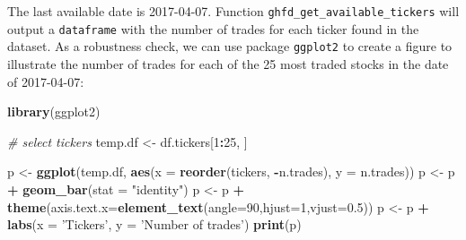 \documentclass[11pt,]{book}
\newenvironment{Shaded}{\begin{snugshade}}{\end{snugshade}}
\newcommand{\KeywordTok}[1]{\textcolor[rgb]{0.27,0.27,0.27}{\textbf{#1}}}
\newcommand{\DataTypeTok}[1]{\textcolor[rgb]{0.27,0.27,0.27}{#1}}
\newcommand{\DecValTok}[1]{\textcolor[rgb]{0.06,0.06,0.06}{#1}}
\newcommand{\FloatTok}[1]{\textcolor[rgb]{0.06,0.06,0.06}{#1}}
\newcommand{\StringTok}[1]{\textcolor[rgb]{0.5,0.5,0.5}{#1}}
\newcommand{\CommentTok}[1]{\textcolor[rgb]{0.56,0.35,0.01}{\textit{#1}}}
\newcommand{\OperatorTok}[1]{\textcolor[rgb]{0.81,0.36,0.00}{\textbf{#1}}}
\newcommand{\NormalTok}[1]{#1}
\begin{document}
\begin{Shaded}
\end{Shaded}

The last available date is 2017-04-07. Function
\texttt{ghfd\_get\_available\_tickers} will output a \texttt{dataframe}
with the number of trades for each ticker found in the dataset. As a
robustness check, we can use package \texttt{ggplot2} to create a figure
to illustrate the number of trades for each of the 25 most traded stocks
in the date of 2017-04-07:

\begin{Shaded}
\begin{Highlighting}[]
\KeywordTok{library}\NormalTok{(ggplot2)}

\CommentTok{# select tickers}
\NormalTok{temp.df <-}\StringTok{ }\NormalTok{df.tickers[}\DecValTok{1}\OperatorTok{:}\DecValTok{25}\NormalTok{, ]}

\NormalTok{p <-}\StringTok{ }\KeywordTok{ggplot}\NormalTok{(temp.df, }\KeywordTok{aes}\NormalTok{(}\DataTypeTok{x =} \KeywordTok{reorder}\NormalTok{(tickers, }\OperatorTok{-}\NormalTok{n.trades), }\DataTypeTok{y =}\NormalTok{ n.trades))}
\NormalTok{p <-}\StringTok{ }\NormalTok{p }\OperatorTok{+}\StringTok{ }\KeywordTok{geom_bar}\NormalTok{(}\DataTypeTok{stat =} \StringTok{"identity"}\NormalTok{)}
\NormalTok{p <-}\StringTok{ }\NormalTok{p }\OperatorTok{+}\StringTok{ }\KeywordTok{theme}\NormalTok{(}\DataTypeTok{axis.text.x=}\KeywordTok{element_text}\NormalTok{(}\DataTypeTok{angle=}\DecValTok{90}\NormalTok{,}\DataTypeTok{hjust=}\DecValTok{1}\NormalTok{,}\DataTypeTok{vjust=}\FloatTok{0.5}\NormalTok{))}
\NormalTok{p <-}\StringTok{ }\NormalTok{p }\OperatorTok{+}\StringTok{ }\KeywordTok{labs}\NormalTok{(}\DataTypeTok{x =} \StringTok{'Tickers'}\NormalTok{, }\DataTypeTok{y =} \StringTok{'Number of trades'}\NormalTok{)}
\KeywordTok{print}\NormalTok{(p)}
\end{Highlighting}
\end{Shaded}
\end{document}
